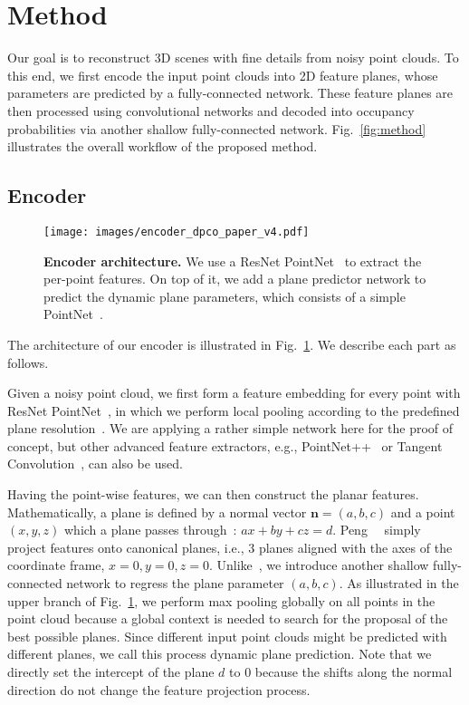 \documentclass[10pt,twocolumn,letterpaper]{article}
\newcommand{\boldparagraph}[1]{\vspace{0.2cm}\noindent{\bf #1:} }
\begin{document}
\section{Method}\label{sec:method}

Our goal is to reconstruct 3D scenes with fine details from noisy point clouds. To this end, we first encode the input point clouds into 2D feature planes, whose parameters are predicted by a fully-connected network. These feature planes are then processed using convolutional networks and decoded into occupancy probabilities via another shallow fully-connected network. Fig.~\ref{fig:method} illustrates the overall workflow of the proposed method.


\subsection{Encoder}

\begin{figure}[!ht]
\centering
\texttt{[image: images/encoder\_dpco\_paper\_v4.pdf]}
\caption{\textbf{Encoder architecture.} We use a ResNet PointNet~\cite{mescheder2018occupancy,peng2020convolutional} to extract the per-point features. On top of it, we add a plane predictor network to predict the dynamic plane parameters, which consists of a simple PointNet~\cite{pointnet}.}
\label{fig:encoder}
\end{figure}

The architecture of our encoder is illustrated in Fig.~\ref{fig:encoder}. We describe each part as follows.

\boldparagraph{Point cloud encoding}
Given a noisy point cloud, we first form a feature embedding for every point with ResNet PointNet~\cite{mescheder2018occupancy}, in which we perform local pooling according to the predefined plane resolution~\cite{peng2020convolutional}.
We are applying a rather simple network here for the proof of concept, but other advanced feature extractors, e.g., PointNet++~\cite{pointnet++} or Tangent Convolution~\cite{tatarchenko2018tangent}, can also be used. 
 
\boldparagraph{Dynamic plane prediction}
Having the point-wise features, we can then construct the planar features.
Mathematically, a plane is defined by a normal vector $\mathbf{n}=(a, b, c)$ and a point $(x, y, z)$ which a plane passes through~\cite{point-planenet}: $ax + by + cz = d$.
Peng~\etal~\cite{peng2020convolutional} simply project features onto canonical planes, i.e., 3 planes aligned with the axes of the coordinate frame, $x = 0, y = 0, z =0$. 
Unlike~\cite{peng2020convolutional}, we introduce another shallow fully-connected network to regress the plane parameter $(a, b, c)$.
As illustrated in the upper branch of Fig.~\ref{fig:encoder}, we perform max pooling globally on all points in the point cloud because a global context is needed to search for the proposal of the best possible planes.
Since different input point clouds might be predicted with different planes, we call this process dynamic plane prediction.
Note that we directly set the intercept of the plane $d$ to 0 because the shifts along the normal direction do not change the feature projection process.
\end{document}
